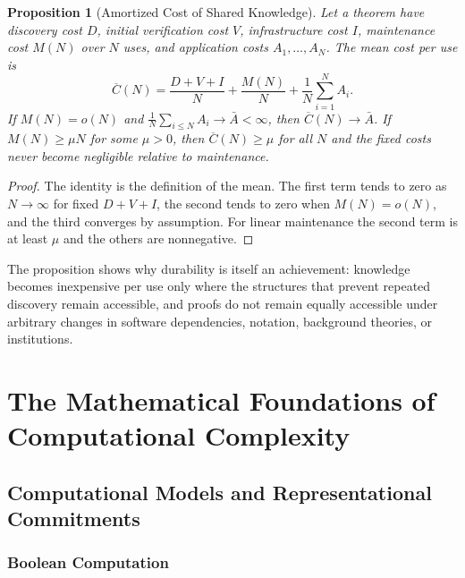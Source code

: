 \documentclass[11pt,letterpaper]{report}
\theoremstyle{plain}
\newtheorem{proposition}[theorem]{Proposition}
\theoremstyle{definition}
\theoremstyle{remark}
\begin{document}
\begin{proposition}[Amortized Cost of Shared Knowledge]
Let a theorem have discovery cost $D$, initial verification cost $V$, infrastructure cost $I$, maintenance cost $M(N)$ over $N$ uses, and application costs $A_1,\ldots,A_N$. The mean cost per use is
\[
\overline C(N)=\frac{D+V+I}{N}+\frac{M(N)}{N}+\frac1N\sum_{i=1}^{N}A_i.
\]
If $M(N)=o(N)$ and $\frac1N\sum_{i\le N}A_i\to\bar A<\infty$, then $\overline C(N)\to\bar A$. If $M(N)\ge\mu N$ for some $\mu>0$, then $\overline C(N)\ge\mu$ for all $N$ and the fixed costs never become negligible relative to maintenance.
\end{proposition}
\begin{proof}
The identity is the definition of the mean. The first term tends to zero as $N\to\infty$ for fixed $D+V+I$, the second tends to zero when $M(N)=o(N)$, and the third converges by assumption. For linear maintenance the second term is at least $\mu$ and the others are nonnegative.
\end{proof}

The proposition shows why durability is itself an achievement: knowledge becomes inexpensive per use only where the structures that prevent repeated discovery remain accessible, and proofs do not remain equally accessible under arbitrary changes in software dependencies, notation, background theories, or institutions.

\part{The Mathematical Foundations of Computational Complexity}

\chapter{Computational Models and Representational Commitments}

\section{Boolean Computation}
\end{document}
